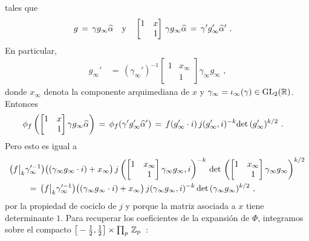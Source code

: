 tales que
\begin{align*}
	g \,=\,\gamma g_{\infty}\hhat{\alpha} & \quad\text{y}\quad
	\begin{bmatrix} 1 & x \\ & 1 \end{bmatrix}\,
		\gamma g_{\infty}\hhat{\alpha} \,=\,
		\gamma' g_{\infty}'\hhat{\alpha}'
	\text{ .}
\end{align*}
%
En particular,
\begin{align*}
	g_{\infty}' & \,=\,(\gamma_{\infty}')^{-1}
		\begin{bmatrix} 1 & x_{\infty} \\ & 1 \end{bmatrix}
		\gamma_{\infty}g_{\infty}
	\text{ ,}
\end{align*}
%
donde $x_{\infty}$ denota la componente arquimediana de $x$ y
$\gamma_{\infty}=\inc[\infty](\gamma)\in\GL_{2}(\bb{R})$. Entonces
\begin{align*}
	\phi_{f}\left(\begin{bmatrix} 1 & x \\ & 1 \end{bmatrix}
		\gamma g_{\infty}\hhat{\alpha}\right) & \,=\,
		\phi_{f}(\gamma' g_{\infty}'\hhat{\alpha}') \,=\,
		f(g_{\infty}'\cdot i)\,
			j(g_{\infty}',i)^{-k}\det(g_{\infty}')^{k/2}
	\text{ .}
\end{align*}
%
Pero esto es igual a
\begin{align*}
	&
	\big(f\operadormatrices{k}{\gamma_{\infty}'^{-1}}\big)
		\big((\gamma_{\infty}g_{\infty}\cdot i)+x_{\infty}\big)\,
	j\left(\begin{bmatrix} 1 & x_{\infty} \\ & 1 \end{bmatrix}
		\gamma_{\infty} g_{\infty},i\right)^{-k}\,
		\det\left(\begin{bmatrix} 1 & x_{\infty} \\ & 1 \end{bmatrix}
		\gamma_{\infty} g_{\infty}\right)^{k/2} \\
	& \qquad\,=\,
	\big(f\operadormatrices{k}{\gamma_{\infty}'^{-1}}\big)
		\big((\gamma_{\infty}g_{\infty}\cdot i)+x_{\infty}\big)\,
		j(\gamma_{\infty} g_{\infty},i)^{-k}\,
		\det(\gamma_{\infty} g_{\infty})^{k/2}
	\text{ ,}
\end{align*}
%
por la propiedad de cociclo de $j$ y porque la matriz asociada a $x$ tiene
determinante $1$. Para recuperar los coeficientes de la expansi\'{o}n de
$\Phi$, integramos sobre el compacto
\begin{math}
	\big[-\frac{1}{2},\frac{1}{2}\big]\times\prod_{p}\,\bb{Z}_{p}
\end{math}~:
